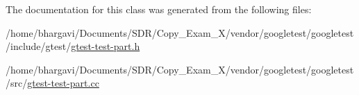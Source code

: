 The documentation for this class was generated from the following files\+:\begin{DoxyCompactItemize}
\item 
/home/bhargavi/\+Documents/\+S\+D\+R/\+Copy\+\_\+\+Exam\+\_\+X/vendor/googletest/googletest/include/gtest/\hyperlink{gtest-test-part_8h}{gtest-\/test-\/part.\+h}\item 
/home/bhargavi/\+Documents/\+S\+D\+R/\+Copy\+\_\+\+Exam\+\_\+X/vendor/googletest/googletest/src/\hyperlink{gtest-test-part_8cc}{gtest-\/test-\/part.\+cc}\end{DoxyCompactItemize}
